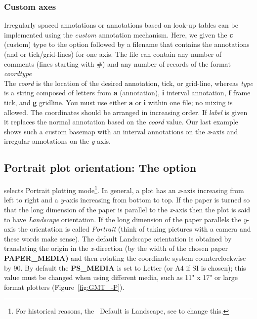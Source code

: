\subsubsection{Custom axes}
\label{sec:custaxes}
Irregularly spaced annotations or annotations based on look-up tables can be implemented using
the \emph{custom} annotation mechanism.  Here, we given the \textbf{c} (custom) type to the 
option followed by a filename that contains the annotations (and or tick/grid-lines) for one axis.
The file can contain any number of comments (lines starting with \#) and any number of records of
the format
\\
\emph{coord}\quad	\emph{type}
\\
The \emph{coord} is the location of the desired annotation, tick, or grid-line, whereas
\emph{type} is a string composed of letters from \textbf{a} (annotation), \textbf{i} interval
annotation, \textbf{f} frame tick, and \textbf{g} gridline.  You must use either \textbf{a} or \textbf{i}
within one file; no mixing is allowed.  The coordinates should be arranged in increasing order.
If \emph{label} is given it replaces the normal
annotation based on the \emph{coord} value.  Our last example shows such a custom basemap
with an interval annotations on the \emph{x}-axis and irregular annotations on the \emph{y}-axis.



\subsection{Portrait plot orientation: The  option}


 selects Portrait plotting mode\footnote{For historical reasons, the \GMT\
Default is Landscape, see  to change this.}.  In general,
a plot has an \emph{x}-axis increasing from left to
right and a \emph{y}-axis increasing from bottom to top.  If the
paper is turned so that the long dimension of the paper is
parallel to the \emph{x}-axis then the plot is said to have
\emph{Landscape} orientation.  If the long dimension of
the paper parallels the \emph{y}-axis the orientation is called
\emph{Portrait} (think of taking pictures with a camera
and these words make sense).  The
default Landscape orientation is obtained by translating the origin in the
\emph{x}-direction (by the width of the chosen paper \textbf{PAPER\_MEDIA)} and then rotating the
coordinate system counterclockwise by 90\DS.  By default the \textbf{PS\_MEDIA} is
set to Letter (or A4 if SI is chosen); this value must be changed
when using different media, such as 11" x 17" or large format plotters
(Figure~\ref{fig:GMT_-P}).


